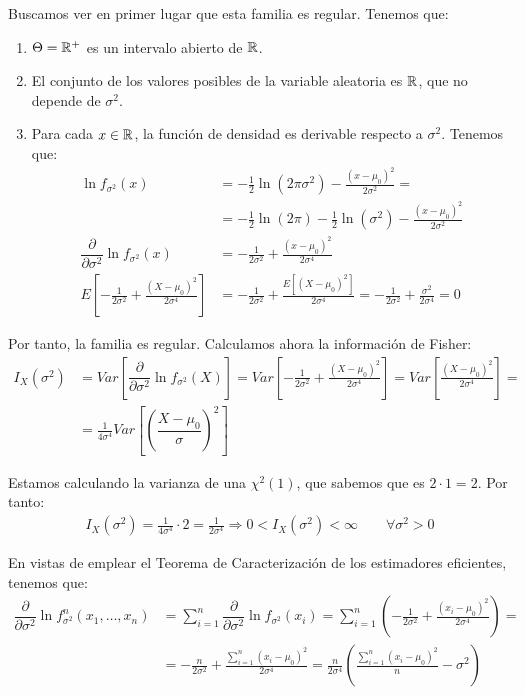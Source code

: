 \begin{ejemplo}
\begin{enumerate}
        Buscamos ver en primer lugar que esta familia es regular. Tenemos que:
        \begin{enumerate}
            \item $\Theta=\mathbb{R}^+$ es un intervalo abierto de $\mathbb{R}$.
            \item El conjunto de los valores posibles de la variable aleatoria es $\mathbb{R}$, que no depende de $\sigma^2$.
            \item Para cada $x \in \mathbb{R}$, la función de densidad es derivable respecto a $\sigma^2$. Tenemos que:
            \begin{align*}
                \ln f_{\sigma^2}(x) &= -\frac{1}{2}\ln(2\pi\sigma^2) - \frac{(x-\mu_0)^2}{2\sigma^2} =\\&= -\frac{1}{2}\ln(2\pi) - \frac{1}{2}\ln(\sigma^2) - \frac{(x-\mu_0)^2}{2\sigma^2}\\
                \dfrac{\partial}{\partial\sigma^2}\ln f_{\sigma^2}(x) &= -\frac{1}{2\sigma^2} + \frac{(x-\mu_0)^2}{2\sigma^4}\\
                E\left[-\frac{1}{2\sigma^2} + \frac{(X-\mu_0)^2}{2\sigma^4}\right] &= -\frac{1}{2\sigma^2} + \frac{E[(X-\mu_0)^2]}{2\sigma^4} = -\frac{1}{2\sigma^2} + \frac{\sigma^2}{2\sigma^4} = 0
            \end{align*}
        \end{enumerate}

        Por tanto, la familia es regular. Calculamos ahora la información de Fisher:
        \begin{align*}
            I_X(\sigma^2) &= Var\left[\dfrac{\partial}{\partial\sigma^2}\ln f_{\sigma^2}(X)\right] = Var\left[-\frac{1}{2\sigma^2} + \frac{(X-\mu_0)^2}{2\sigma^4}\right] = Var\left[\frac{(X-\mu_0)^2}{2\sigma^4}\right] =\\&= \frac{1}{4\sigma^4} Var\left[\left(\dfrac{X-\mu_0}{\sigma}\right)^2\right]
        \end{align*}

        Estamos calculando la varianza de una $\chi^2(1)$, que sabemos que es $2\cdot 1=2$. Por tanto:
        \begin{align*}
            I_X(\sigma^2) = \frac{1}{4\sigma^4} \cdot 2 = \frac{1}{2\sigma^4}\Longrightarrow 0< I_X(\sigma^2) < \infty\qquad \forall \sigma^2 > 0
        \end{align*}

        En vistas de emplear el Teorema de Caracterización de los estimadores eficientes, tenemos que:
        \begin{align*}
            \dfrac{\partial}{\partial\sigma^2}\ln f_{\sigma^2}^n(x_1, \ldots, x_n) &= \sum_{i=1}^n \dfrac{\partial}{\partial\sigma^2}\ln f_{\sigma^2}(x_i) = \sum_{i=1}^n \left(-\frac{1}{2\sigma^2} + \frac{(x_i-\mu_0)^2}{2\sigma^4}\right) =\\&= -\frac{n}{2\sigma^2} + \frac{\sum\limits_{i=1}^n (x_i-\mu_0)^2}{2\sigma^4}
            = \frac{n}{2\sigma^4}\left(\frac{\sum\limits_{i=1}^n (x_i-\mu_0)^2}{n} - \sigma^2\right)
        \end{align*}


\end{enumerate}
\end{ejemplo}
